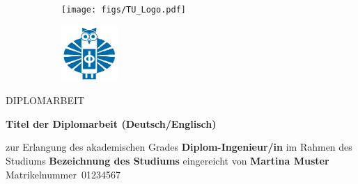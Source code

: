 \newcommand{\thesistitle}{Titel der Diplomarbeit (Deutsch/Englisch)}
\newcommand{\thesisdegree}{Diplom-Ingenieur/in}
\newcommand{\thesisstudies}{Bezeichnung des Studiums}
\newcommand{\thesisauthor}{Martina Muster}
\newcommand{\thesisstudentnumber}{01234567}
\newcommand{\thesisinstitute}{XYZ}
\newcommand{\thesisfaculty}{XYZ}
\newcommand{\thesisuniversity}{Technischen Universit\"{a}t Wien}
\newcommand{\thesiscollaboration}{XYZ}
\newcommand{\thesissupervisor}{Titel Dr. Vorname Familienname}
\newcommand{\thesiscosupervisor}{Univ.-Ass. Dr. Vorname Familienname}
\newcommand{\thesisplace}{Wien}
\newcommand{\thesisdate}{TT.MM.JJJJ}

\thispagestyle{empty}

\begin{titlepage}

  \begingroup
  \selectfont

  \begin{figure}[h]
    \centering
    \begin{subfigure}{.5\textwidth}
      \flushleft
      \texttt{[image: figs/TU\_Logo.pdf]}
    \end{subfigure}%
    \begin{subfigure}{.5\textwidth}
      \flushright
      \includegraphics[height=60pt]{figs/fakultaet-physik_logo.png}
    \end{subfigure}
  \end{figure}

  \vspace*{1.5cm}
  
  \begin{center}
    {\Large DIPLOMARBEIT}
    
    \vspace{2.25cm}
    
    {\huge\textbf{\thesistitle}}

    \vspace{2.25cm}

    \begin{minipage}[t][0.22\paperheight]{\textwidth}
      \centering
      zur Erlangung des akademischen Grades
      \vfill
      {\Large \textbf{\thesisdegree}}
      \vfill
      im Rahmen des Studiums
      \vfill
      {\Large\textbf{\thesisstudies}}
      \vfill
      eingereicht von
      \vfill
      {\Large\textbf{\thesisauthor}}\\[1mm]
      Matrikelnummer~\thesisstudentnumber
    \end{minipage}
               

\end{center}
\end{titlepage}
